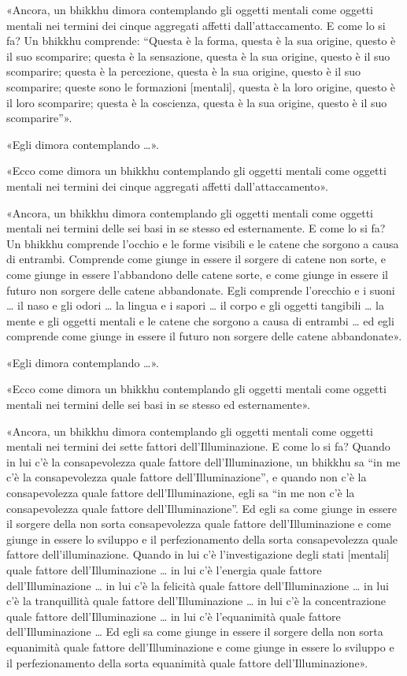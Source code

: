 «Ancora, un bhikkhu dimora contemplando gli oggetti mentali come oggetti mentali
nei termini dei cinque aggregati affetti dall’attaccamento. E come lo si fa? Un
bhikkhu comprende: “Questa è la forma, questa è la sua origine, questo è il suo
scomparire; questa è la sensazione, questa è la sua origine, questo è il suo
scomparire; questa è la percezione, questa è la sua origine, questo è il suo
scomparire; queste sono le formazioni [mentali], questa è la loro origine,
questo è il loro scomparire; questa è la coscienza, questa è la sua origine,
questo è il suo scomparire”».

«Egli dimora contemplando …».

«Ecco come dimora un bhikkhu contemplando gli oggetti mentali come oggetti
mentali nei termini dei cinque aggregati affetti dall’attaccamento».

«Ancora, un bhikkhu dimora contemplando gli oggetti mentali come oggetti mentali
nei termini delle sei basi in se stesso ed esternamente. E come lo si fa? Un
bhikkhu comprende l’occhio e le forme visibili e le catene che sorgono a causa
di entrambi. Comprende come giunge in essere il sorgere di catene non sorte, e
come giunge in essere l’abbandono delle catene sorte, e come giunge in essere il
futuro non sorgere delle catene abbandonate. Egli comprende l’orecchio e i suoni
… il naso e gli odori … la lingua e i sapori … il corpo e gli oggetti tangibili
… la mente e gli oggetti mentali e le catene che sorgono a causa di entrambi …
ed egli comprende come giunge in essere il futuro non sorgere delle catene
abbandonate».

«Egli dimora contemplando …».

«Ecco come dimora un bhikkhu contemplando gli oggetti mentali come oggetti
mentali nei termini delle sei basi in se stesso ed esternamente».

«Ancora, un bhikkhu dimora contemplando gli oggetti mentali come oggetti mentali
nei termini dei sette fattori dell’Illuminazione. E come lo si fa? Quando in lui
c’è la consapevolezza quale fattore dell’Illuminazione, un bhikkhu sa “in me c’è
la consapevolezza quale fattore dell’Illuminazione”, e quando non c’è la
consapevolezza quale fattore dell’Illuminazione, egli sa “in me non c’è la
consapevolezza quale fattore dell’Illuminazione”. Ed egli sa come giunge in
essere il sorgere della non sorta consapevolezza quale fattore
dell’Illuminazione e come giunge in essere lo sviluppo e il perfezionamento
della sorta consapevolezza quale fattore dell’illuminazione. Quando in lui c’è
l’investigazione degli stati [mentali] quale fattore dell’Illuminazione … in lui
c’è l’energia quale fattore dell’Illuminazione … in lui c’è la felicità quale
fattore dell’Illuminazione … in lui c’è la tranquillità quale fattore
dell’Illuminazione … in lui c’è la concentrazione quale fattore
dell’Illuminazione … in lui c’è l’equanimità quale fattore dell’Illuminazione …
Ed egli sa come giunge in essere il sorgere della non sorta equanimità quale
fattore dell’Illuminazione e come giunge in essere lo sviluppo e il
perfezionamento della sorta equanimità quale fattore dell’Illuminazione».

